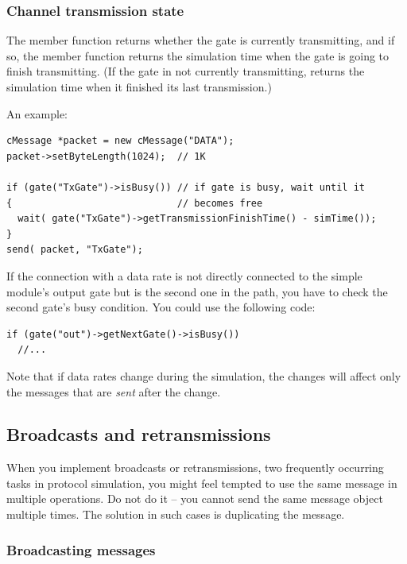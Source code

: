\subsubsection{Channel transmission state}
\label{sec:simple-modules:cgate-transmission-state}

The  member function returns whether the gate
is currently transmitting, and if so, the
 member function
returns the simulation time when the gate is going to finish
transmitting. (If the gate in not currently transmitting,
 returns the simulation time
when it finished its last transmission.)

An example:

\begin{verbatim}
cMessage *packet = new cMessage("DATA");
packet->setByteLength(1024);  // 1K

if (gate("TxGate")->isBusy()) // if gate is busy, wait until it
{                             // becomes free
  wait( gate("TxGate")->getTransmissionFinishTime() - simTime());
}
send( packet, "TxGate");
\end{verbatim}

If the connection with a data rate is not directly connected
to the simple module's output gate but is the second
one in the path, you have to check the second gate's busy
condition. You could use the following
code:

\begin{verbatim}
if (gate("out")->getNextGate()->isBusy())
  //...
\end{verbatim}

Note that if data rates change during the
simulation, the changes will affect only the messages that are
\textit{sent} after the change.



\subsection{Broadcasts and retransmissions}

When you implement broadcasts or retransmissions, two frequently
occurring tasks in protocol simulation, you might feel tempted
to use the same message in multiple  operations.
Do not do it -- you cannot send the same message object multiple times.
The solution in such cases is duplicating the message.

\subsubsection{Broadcasting messages}


